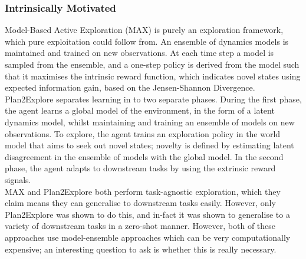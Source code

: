 \subsubsection{Intrinsically Motivated}
Model-Based Active Exploration (MAX) \cite{DBLP:journals/corr/abs-1810-12162} is purely an exploration framework, which pure exploitation could follow from. An ensemble of dynamics models is maintained and trained on new observations. At each time step a model is sampled from the ensemble, and a one-step policy is derived from the model such that it maximises the intrinsic reward function, which indicates novel states using expected information gain, based on the Jensen-Shannon Divergence.
\\Plan2Explore \cite{plan2explore} separates learning in to two separate phases. During the first phase, the agent learns a global model of the environment, in the form of a latent dynamics model, whilst maintaining and training an ensemble of models on new observations. To explore, the agent trains an exploration policy in the world model that aims to seek out novel states; novelty is defined by estimating latent disagreement in the ensemble of models with the global model. In the second phase, the agent adapts to downstream tasks by using the extrinsic reward signals.
\\ MAX and Plan2Explore both perform task-agnostic exploration, which they claim means they can generalise to downstream tasks easily. However, only Plan2Explore was shown to do this, and in-fact it was shown to generalise to a variety of downstream tasks in a zero-shot manner. However, both of these approaches use model-ensemble approaches which can be very computationally expensive; an interesting question to ask is whether this is really necessary.
